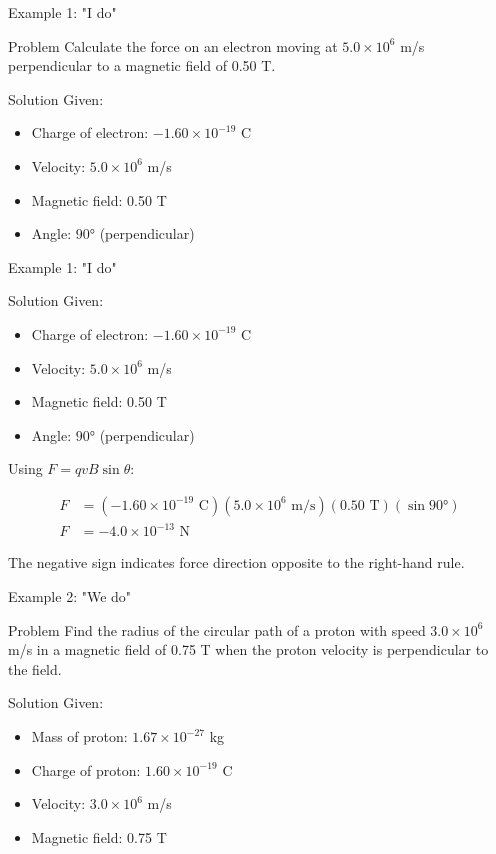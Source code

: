 \documentclass{beamer}
\begin{document}
\begin{frame}{Example 1: "I do"}
\begin{block}{Problem}
Calculate the force on an electron moving at $5.0 \times 10^6$ m/s perpendicular to a magnetic field of 0.50 T.
\end{block}
\pause
\begin{block}{Solution}
Given:
\begin{itemize}
\item Charge of electron: $-1.60 \times 10^{-19}$ C
\item Velocity: $5.0 \times 10^6$ m/s
\item Magnetic field: 0.50 T
\item Angle: $90°$ (perpendicular)
\end{itemize}
\end{block}
\end{frame}

\begin{frame}{Example 1: "I do"}
\begin{block}{Solution}
Given:
\begin{itemize}
\item Charge of electron: $-1.60 \times 10^{-19}$ C
\item Velocity: $5.0 \times 10^6$ m/s
\item Magnetic field: 0.50 T
\item Angle: $90°$ (perpendicular)
\end{itemize}

Using $F = qvB\sin\theta$:

\pause

\begin{align}
F &= (-1.60 \times 10^{-19} \text{ C})(5.0 \times 10^6 \text{ m/s})(0.50 \text{ T})(\sin 90°) \\
F &= -4.0 \times 10^{-13} \text{ N}
\end{align}

The negative sign indicates force direction opposite to the right-hand rule.
\end{block}
\end{frame}

\begin{frame}{Example 2: "We do"}
\begin{block}{Problem}
Find the radius of the circular path of a proton with speed $3.0 \times 10^6$ m/s in a magnetic field of 0.75 T when the proton velocity is perpendicular to the field.
\end{block}
\pause

\begin{block}{Solution}
Given:
\begin{itemize}
\item Mass of proton: $1.67 \times 10^{-27}$ kg
\item Charge of proton: $1.60 \times 10^{-19}$ C
\item Velocity: $3.0 \times 10^6$ m/s
\item Magnetic field: 0.75 T
\end{itemize}
\end{block}
\end{frame}
\end{document}
